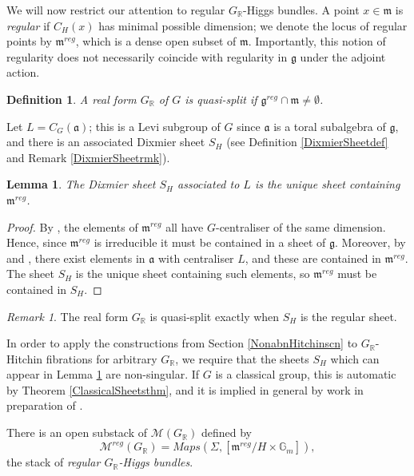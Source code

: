 \documentclass{amsart}
\newtheorem{lemma}[theorem]{Lemma}
\newtheorem{definition}[theorem]{Definition}
\theoremstyle{remark}
\newtheorem{remark}[theorem]{Remark}
\numberwithin{theorem}{section}
\numberwithin{equation}{section}
\begin{document}
We will now restrict our attention to regular $G_\mathbb{R}$-Higgs bundles. A point $x \in \mathfrak{m}$ is \emph{regular} if $C_H(x)$ has minimal possible dimension; we denote the locus of regular points by $\mathfrak{m}^{reg}$, which is a dense open subset of $\mathfrak{m}$. Importantly, this notion of regularity does not necessarily coincide with regularity in $\mathfrak{g}$ under the adjoint action.

\begin{definition}\label{QuasiSplitdef}
    A real form $G_\mathbb{R}$ of $G$ is \emph{quasi-split} if $\mathfrak{g}^{reg} \cap \mathfrak{m} \neq \emptyset$.
\end{definition}

Let $L = C_G(\mathfrak{a})$; this is a Levi subgroup of $G$ since $\mathfrak{a}$ is a toral subalgebra of $\mathfrak{g}$, and there is an associated Dixmier sheet $S_H$ (see Definition \ref{DixmierSheetdef} and Remark \ref{DixmierSheetrmk}).

\begin{lemma}\label{RealSheetlem}
    The Dixmier sheet $S_H$ associated to $L$ is the unique sheet containing $\mathfrak{m}^{reg}$.
\end{lemma}
\begin{proof}
By \cite[Proposition 5]{KR}, the elements of $
\mathfrak{m}^{reg}$ all have $G$-centraliser of the same dimension. Hence, since $\mathfrak{m}^{reg}$ is irreducible it must be contained in a sheet of $\mathfrak{g}$. Moreover, by \cite[Remark 3]{KR} and \cite[Proposition 8]{KR}, there exist elements in $\mathfrak{a}$ with centraliser $L$, and these are contained in $\mathfrak{m}^{reg}$. The sheet $S_H$ is the unique sheet containing such elements, so $\mathfrak{m}^{reg}$ must be contained in $S_H$.
\end{proof}

\begin{remark}\label{RealSheetrmk}
     The real form $G_{\mathbb{R}}$ is quasi-split exactly when $S_H$ is the regular sheet.
\end{remark}

In order to apply the constructions from Section \ref{NonabnHitchinscn} to $G_\mathbb{R}$-Hitchin fibrations for arbitrary $G_\mathbb{R}$, we require that the sheets $S_H$ which can appear in Lemma \ref{RealSheetlem} are non-singular. If $G$ is a classical group, this is automatic by Theorem \ref{ClassicalSheetsthm}, and it is implied in general by work in preparation of \cite{Bulois}.

There is an open substack of $\mathcal M(G_{\mathbb{R}})$ defined by
\begin{equation}\label{RegularRealHiggsrmk}
    \mathcal M^{reg}(G_{\mathbb{R}}) = Maps(\Sigma,[\mathfrak{m}^{reg}/H \times \mathbb{G}_m]),
\end{equation}
the stack of \emph{regular $G_{\mathbb{R}}$-Higgs bundles}.
\end{document}
